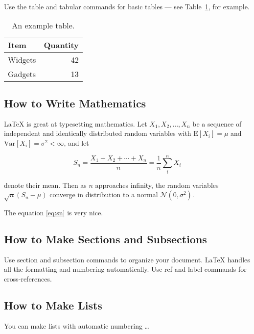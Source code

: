 \documentclass[a4paper]{article}
\begin{document}
      Use the table and tabular commands for basic tables --- see Table~\ref{tab:widgets}, for example.
      
      \begin{table}
      \centering
      \begin{tabular}{l|r}
      Item & Quantity \\\hline
      Widgets & 42 \\
      Gadgets & 13
      \end{tabular}
      \caption{\label{tab:widgets}An example table.}
      \end{table}
      
      \subsection{How to Write Mathematics}
      
      \LaTeX{} is great at typesetting mathematics. Let $X_1, X_2, \ldots, X_n$ be a sequence of independent and identically distributed random variables with $\text{E}[X_i] = \mu$ and $\text{Var}[X_i] = \sigma^2 < \infty$, and let
      
      \begin{equation}
      S_n = \frac{X_1 + X_2 + \cdots + X_n}{n}
            = \frac{1}{n}\sum_{i}^{n} X_i
      \label{eq:sn}
      \end{equation}
      
      denote their mean. Then as $n$ approaches infinity, the random variables $\sqrt{n}(S_n - \mu)$ converge in distribution to a normal $\mathcal{N}(0, \sigma^2)$.
      
      The equation \ref{eq:sn} is very nice.
      
      \subsection{How to Make Sections and Subsections}
      
      Use section and subsection commands to organize your document. \LaTeX{} handles all the formatting and numbering automatically. Use ref and label commands for cross-references.
      
      \subsection{How to Make Lists}
      
      You can make lists with automatic numbering \dots
      
\end{document}
